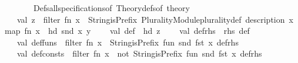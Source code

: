 \begin{isabellebody}
\ \ \ \ \ \ \ \ {\isacharparenleft}{\kern0pt}Defs{\isachardot}{\kern0pt}all{\isacharunderscore}{\kern0pt}specifications{\isacharunderscore}{\kern0pt}of\ {\isacharparenleft}{\kern0pt}Theory{\isachardot}{\kern0pt}defs{\isacharunderscore}{\kern0pt}of\ {\isacharat}{\kern0pt}{\isacharbraceleft}{\kern0pt}theory{\isacharbraceright}{\kern0pt}{\isacharparenright}{\kern0pt}{\isacharparenright}{\kern0pt}\isanewline
\ \ \ \ val\ z\ {\isacharequal}{\kern0pt}\ filter\ {\isacharparenleft}{\kern0pt}fn\ x\ {\isacharequal}{\kern0pt}{\isachargreater}{\kern0pt}\ String{\isachardot}{\kern0pt}isPrefix\ {\isacharparenleft}{\kern0pt}{\isachardoublequote}{\kern0pt}Plurality{\isacharunderscore}{\kern0pt}Module{\isachardot}{\kern0pt}plurality{\isacharunderscore}{\kern0pt}def{\isachardoublequote}{\kern0pt}{\isacharparenright}{\kern0pt}\ {\isacharparenleft}{\kern0pt}{\isacharhash}{\kern0pt}description\ x{\isacharparenright}{\kern0pt}{\isacharparenright}{\kern0pt}\ {\isacharparenleft}{\kern0pt}map\ {\isacharparenleft}{\kern0pt}fn\ x\ {\isacharequal}{\kern0pt}{\isachargreater}{\kern0pt}\ {\isacharparenleft}{\kern0pt}hd\ {\isacharparenleft}{\kern0pt}snd\ x{\isacharparenright}{\kern0pt}{\isacharparenright}{\kern0pt}{\isacharparenright}{\kern0pt}\ y{\isacharparenright}{\kern0pt}\isanewline
\isanewline
\ \ \ \ val\ def\ {\isacharequal}{\kern0pt}\ hd\ z\isanewline
\ \ \ \ val\ def{\isacharunderscore}{\kern0pt}rhs\ {\isacharequal}{\kern0pt}\ {\isacharhash}{\kern0pt}rhs\ def\isanewline
\isanewline
\ \ \ \ val\ def{\isacharunderscore}{\kern0pt}funs\ {\isacharequal}{\kern0pt}\ filter\ {\isacharparenleft}{\kern0pt}fn\ x\ {\isacharequal}{\kern0pt}{\isachargreater}{\kern0pt}\ String{\isachardot}{\kern0pt}isPrefix\ {\isacharparenleft}{\kern0pt}{\isachardoublequote}{\kern0pt}fun{\isachardoublequote}{\kern0pt}{\isacharparenright}{\kern0pt}\ {\isacharparenleft}{\kern0pt}snd\ {\isacharparenleft}{\kern0pt}fst\ x{\isacharparenright}{\kern0pt}{\isacharparenright}{\kern0pt}{\isacharparenright}{\kern0pt}\ {\isacharparenleft}{\kern0pt}def{\isacharunderscore}{\kern0pt}rhs{\isacharparenright}{\kern0pt}\isanewline
\ \ \ \ val\ def{\isacharunderscore}{\kern0pt}consts\ {\isacharequal}{\kern0pt}\ filter\ {\isacharparenleft}{\kern0pt}fn\ x\ {\isacharequal}{\kern0pt}{\isachargreater}{\kern0pt}\ not\ {\isacharparenleft}{\kern0pt}String{\isachardot}{\kern0pt}isPrefix\ {\isacharparenleft}{\kern0pt}{\isachardoublequote}{\kern0pt}fun{\isachardoublequote}{\kern0pt}{\isacharparenright}{\kern0pt}\ {\isacharparenleft}{\kern0pt}snd\ {\isacharparenleft}{\kern0pt}fst\ x{\isacharparenright}{\kern0pt}{\isacharparenright}{\kern0pt}{\isacharparenright}{\kern0pt}{\isacharparenright}{\kern0pt}\ {\isacharparenleft}{\kern0pt}def{\isacharunderscore}{\kern0pt}rhs{\isacharparenright}{\kern0pt}\isanewline

\end{isabellebody}

